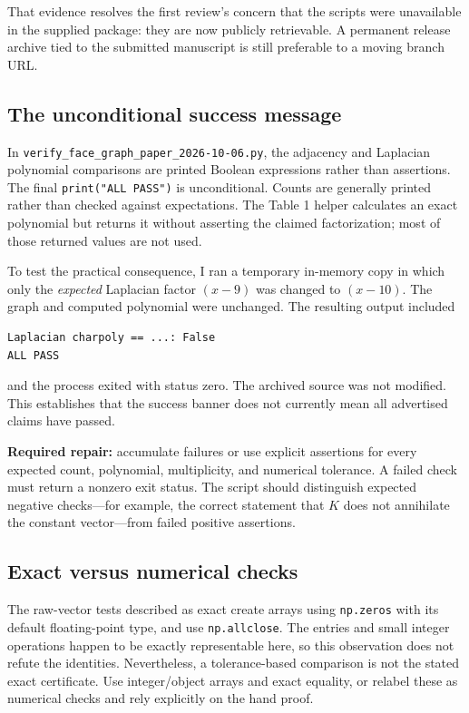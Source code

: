 \documentclass[11pt,a4paper]{article}
\begin{document}
That evidence resolves the first review's concern that the scripts were unavailable in the supplied package: they are now publicly retrievable. A permanent release archive tied to the submitted manuscript is still preferable to a moving branch URL.

\subsection{The unconditional success message}
In \texttt{verify\_face\_graph\_paper\_2026-10-06.py}, the adjacency and Laplacian polynomial comparisons are printed Boolean expressions rather than assertions. The final \texttt{print("ALL PASS")} is unconditional. Counts are generally printed rather than checked against expectations. The Table 1 helper calculates an exact polynomial but returns it without asserting the claimed factorization; most of those returned values are not used.

To test the practical consequence, I ran a temporary in-memory copy in which only the \emph{expected} Laplacian factor $(x-9)$ was changed to $(x-10)$. The graph and computed polynomial were unchanged. The resulting output included
\begin{verbatim}
Laplacian charpoly == ...: False
ALL PASS
\end{verbatim}
and the process exited with status zero. The archived source was not modified. This establishes that the success banner does not currently mean all advertised claims have passed.

\textbf{Required repair:} accumulate failures or use explicit assertions for every expected count, polynomial, multiplicity, and numerical tolerance. A failed check must return a nonzero exit status. The script should distinguish expected negative checks---for example, the correct statement that $K$ does not annihilate the constant vector---from failed positive assertions.

\subsection{Exact versus numerical checks}
The raw-vector tests described as exact create arrays using \texttt{np.zeros} with its default floating-point type, and use \texttt{np.allclose}. The entries and small integer operations happen to be exactly representable here, so this observation does not refute the identities. Nevertheless, a tolerance-based comparison is not the stated exact certificate. Use integer/object arrays and exact equality, or relabel these as numerical checks and rely explicitly on the hand proof.
\end{document}
